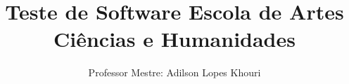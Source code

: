 \documentclass[compress, hyperref={pdfpagelayout=SinglePage}]{beamer}
\title[SIN5022]{Teste de Software Escola de Artes Ciências e Humanidades}
\author{Professor Mestre: Adilson Lopes Khouri}
\begin{document}
	\begin{frame}
		\titlepage
	\end{frame}
	
	
	
	
	
	

	
		
	
	
	

	

	
\end{document}
